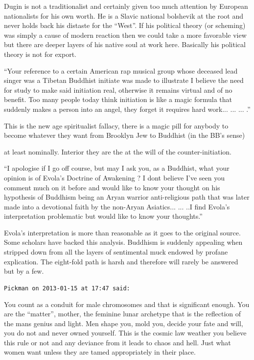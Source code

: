 \begin{footnotesize}
\begin{sffamily}
Dugin is not a traditionalist and certainly given too much attention by European nationalists for his own worth. He is a Slavic national bolshevik at the root and never holds back his distaste for the ``West''. If his political theory (or scheming) was simply a cause of modern reaction then we could take a more favorable view but there are deeper layers of his native soul at work here. Basically his political theory is not for export.

``Your reference to a certain American rap musical group whose deceased lead singer was a Tibetan Buddhist initiate was made to illustrate I believe the need for study to make said initiation real, otherwise it remains virtual and of no benefit. Too many people today think initiation is like a magic formula that suddenly makes a person into an angel, they forget it requires hard work... ... ... .''

This is the new age spiritualist fallacy, there is a magic pill for anybody to become whatever they want from Brooklyn Jew to Buddhist (in the BB's sense)

at least nominally. Interior they are the at the will of the counter-initiation.

``I apologise if I go off course, but may I ask you, as a Buddhist, what your opinion is of Evola's Doctrine of Awakening ? I dont believe I've seen you comment much on it before and would like to know your thought on his hypothesis of Buddhism being an Aryan warrior anti-religious path that was later made into a devotional faith by the non-Aryan Asiatics... ... ..I find Evola's interpretation problematic but would like to know your thoughts.''

Evola's interpretation is more than reasonable as it goes to the original source. Some scholars have backed this analysis. Buddhism is suddenly appealing when stripped down from all the layers of sentimental muck endowed by profane explication. The eight-fold path is harsh and therefore will rarely be answered but by a few.

\hfill

\texttt{Pickman on 2013-01-15 at 17:47 said:}

You count as a conduit for male chromosomes and that is significant enough. You are the ``matter'', mother, the feminine lunar archetype that is the reflection of the mans genius and light. Men shape you, mold you, decide your fate and will, you do not and never owned yourself. This is the cosmic law weather you believe this rule or not and any deviance from it leads to chaos and hell. Just what women want unless they are tamed appropriately in their place.


\end{sffamily}
\end{footnotesize}
